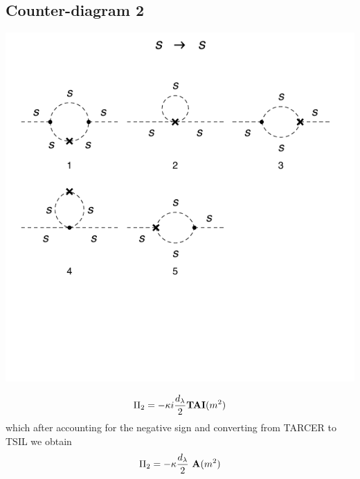 \documentclass[11pt]{article}
\begin{document}
  \subsection*{Counter-diagram 2}
 \begin{center}
\includegraphics{2loop_2c.pdf}
\end{center}

 \begin{align}
 \Pi_2 = - \kappa i  \frac{d_{\lambda}}{2} {\tt{\mathbf{TAI}}}(m^2)
 \end{align}
 which after accounting for the negative sign and converting from TARCER to TSIL we obtain
  \begin{align}
 \Pi_2 = - \kappa \frac{d_{\lambda}}{2} \ {\tt{\mathbf{A}}}(m^2)
 \end{align}
 
\end{document}
